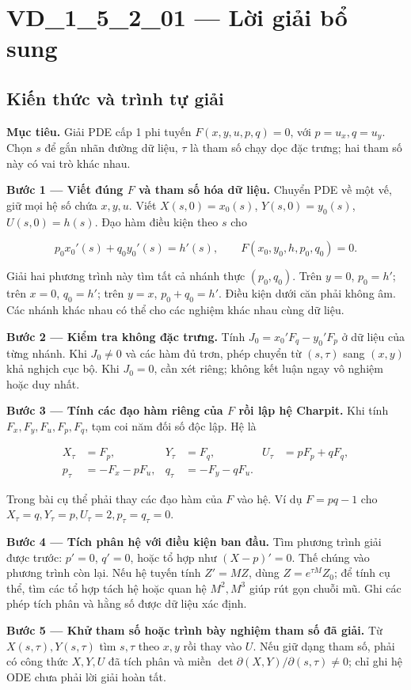 \documentclass[10pt,a4paper]{article}
\begin{document}
\section*{VD\_1\_5\_2\_01 — Lời giải bổ sung}
\subsection*{Kiến thức và trình tự giải}
\textbf{Mục tiêu.} Giải PDE cấp 1 phi tuyến $F(x,y,u,p,q)=0$, với $p=u_x,q=u_y$. Chọn $s$ để gắn nhãn đường dữ liệu, $\tau$ là tham số chạy dọc đặc trưng; hai tham số này có vai trò khác nhau.

\textbf{Bước 1 — Viết đúng $F$ và tham số hóa dữ liệu.} Chuyển PDE về một vế, giữ mọi hệ số chứa $x,y,u$. Viết $X(s,0)=x_0(s)$, $Y(s,0)=y_0(s)$, $U(s,0)=h(s)$. Đạo hàm điều kiện theo $s$ cho

\[
p_0x_0'(s)+q_0y_0'(s)=h'(s),\qquad
F(x_0,y_0,h,p_0,q_0)=0.
\]

Giải hai phương trình này tìm tất cả nhánh thực $(p_0,q_0)$. Trên $y=0$, $p_0=h'$; trên $x=0$, $q_0=h'$; trên $y=x$, $p_0+q_0=h'$. Điều kiện dưới căn phải không âm. Các nhánh khác nhau có thể cho các nghiệm khác nhau cùng dữ liệu.

\textbf{Bước 2 — Kiểm tra không đặc trưng.} Tính $J_0=x_0'F_q-y_0'F_p$ ở dữ liệu của từng nhánh. Khi $J_0\ne0$ và các hàm đủ trơn, phép chuyển từ $(s,\tau)$ sang $(x,y)$ khả nghịch cục bộ. Khi $J_0=0$, cần xét riêng; không kết luận ngay vô nghiệm hoặc duy nhất.

\textbf{Bước 3 — Tính các đạo hàm riêng của $F$ rồi lập hệ Charpit.} Khi tính $F_x,F_y,F_u,F_p,F_q$, tạm coi năm đối số độc lập. Hệ là

\[
\begin{aligned}
X_\tau&=F_p,&Y_\tau&=F_q,&U_\tau&=pF_p+qF_q,\\
p_\tau&=-F_x-pF_u,&q_\tau&=-F_y-qF_u.
\end{aligned}
\]

Trong bài cụ thể phải thay các đạo hàm của $F$ vào hệ. Ví dụ $F=pq-1$ cho $X_\tau=q,Y_\tau=p,U_\tau=2,p_\tau=q_\tau=0$.

\textbf{Bước 4 — Tích phân hệ với điều kiện ban đầu.} Tìm phương trình giải được trước: $p'=0$, $q'=0$, hoặc tổ hợp như $(X-p)'=0$. Thế chúng vào phương trình còn lại. Nếu hệ tuyến tính $Z'=MZ$, dùng $Z=e^{\tau M}Z_0$; để tính cụ thể, tìm các tổ hợp tách hệ hoặc quan hệ $M^2, M^3$ giúp rút gọn chuỗi mũ. Ghi các phép tích phân và hằng số được dữ liệu xác định.

\textbf{Bước 5 — Khử tham số hoặc trình bày nghiệm tham số đã giải.} Từ $X(s,\tau),Y(s,\tau)$ tìm $s,\tau$ theo $x,y$ rồi thay vào $U$. Nếu giữ dạng tham số, phải có công thức $X,Y,U$ đã tích phân và miền $\det\partial(X,Y)/\partial(s,\tau)\ne0$; chỉ ghi hệ ODE chưa phải lời giải hoàn tất.
\end{document}
